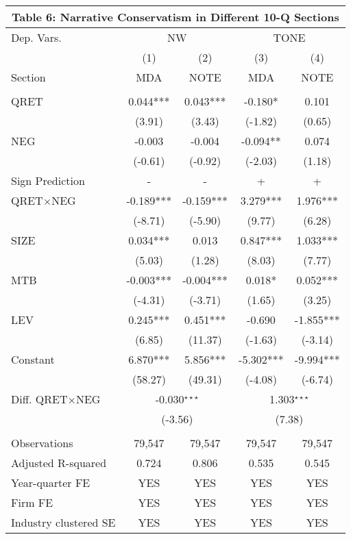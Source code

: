 \begin{table}[htbp] \label{T6}
  \centering
    \begin{tabular}{lcccc}
    \multicolumn{5}{c}{\textbf{Table 6: Narrative Conservatism in Different 10-Q Sections}} \\
    \midrule
    \midrule
    Dep. Vars.& \multicolumn{2}{c}{NW} & \multicolumn{2}{c}{TONE} \\
    \cmidrule{2-5}
      & (1) & (2) & (3) & (4) \\
    Section & MDA & NOTE & MDA & NOTE \\
    \midrule
      &   &   &   &  \\
    QRET & 0.044*** & 0.043*** & -0.180* & 0.101 \\
      & (3.91) & (3.43) & (-1.82) & (0.65) \\
    NEG & -0.003 & -0.004 & -0.094** & 0.074 \\
      & (-0.61) & (-0.92) & (-2.03) & (1.18) \\
    \rowcolor[rgb]{ .933,  .925,  .882} Sign Prediction & - & - & + & + \\
    \rowcolor[rgb]{ .933,  .925,  .882} QRET$\times$NEG & -0.189*** & -0.159*** & 3.279*** & 1.976*** \\
    \rowcolor[rgb]{ .933,  .925,  .882}   & (-8.71) & (-5.90) & (9.77) & (6.28) \\
    SIZE & 0.034*** & 0.013 & 0.847*** & 1.033*** \\
      & (5.03) & (1.28) & (8.03) & (7.77) \\
    MTB & -0.003*** & -0.004*** & 0.018* & 0.052*** \\
      & (-4.31) & (-3.71) & (1.65) & (3.25) \\
    LEV & 0.245*** & 0.451*** & -0.690 & -1.855*** \\
      & (6.85) & (11.37) & (-1.63) & (-3.14) \\
    Constant & 6.870*** & 5.856*** & -5.302*** & -9.994*** \\
      & (58.27) & (49.31) & (-4.08) & (-6.74) \\
    \rowcolor[rgb]{ .933,  .925,  .882} Diff. QRET$\times$NEG & \multicolumn{2}{c}{ -0.030$^{\star\star\star}$} & \multicolumn{2}{c}{1.303$^{\star\star\star}$} \\
    \rowcolor[rgb]{ .933,  .925,  .882}  & \multicolumn{2}{c}{(-3.56)} & \multicolumn{2}{c}{ (7.38)} \\
      &   &   &   &  \\
    Observations & 79,547 & 79,547 & 79,547 & 79,547 \\
    Adjusted R-squared & 0.724 & 0.806 & 0.535 & 0.545 \\
    Year-quarter FE & YES & YES & YES & YES \\
    Firm FE & YES & YES & YES & YES \\
    Industry clustered SE & YES & YES & YES & YES \\
    \bottomrule
    \bottomrule
    \end{tabular}%
\end{table}%

